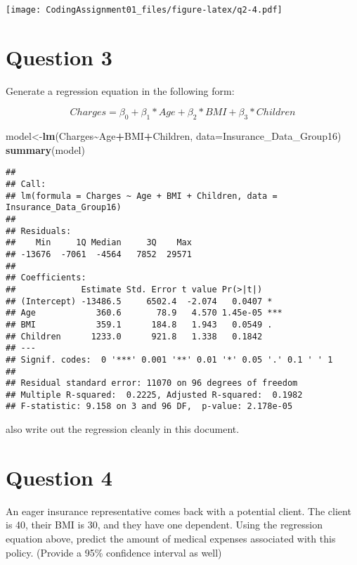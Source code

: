\documentclass[
]{article}
\newenvironment{Shaded}{\begin{snugshade}}{\end{snugshade}}
\newcommand{\AttributeTok}[1]{\textcolor[rgb]{0.13,0.29,0.53}{#1}}
\newcommand{\FunctionTok}[1]{\textcolor[rgb]{0.13,0.29,0.53}{\textbf{#1}}}
\newcommand{\NormalTok}[1]{#1}
\newcommand{\OtherTok}[1]{\textcolor[rgb]{0.56,0.35,0.01}{#1}}
\newcommand{\SpecialCharTok}[1]{\textcolor[rgb]{0.81,0.36,0.00}{\textbf{#1}}}
\begin{document}
\texttt{[image: CodingAssignment01\_files/figure-latex/q2-4.pdf]}

\hypertarget{question-3}{%
\section{Question 3}\label{question-3}}

Generate a regression equation in the following form:

\[Charges = \beta_{0}+\beta_{1}*Age+\beta_{2}*BMI+\beta_{3}*Children\]

\begin{Shaded}
\begin{Highlighting}[]
\NormalTok{model}\OtherTok{\textless{}{-}}\FunctionTok{lm}\NormalTok{(Charges}\SpecialCharTok{\textasciitilde{}}\NormalTok{Age}\SpecialCharTok{+}\NormalTok{BMI}\SpecialCharTok{+}\NormalTok{Children, }\AttributeTok{data=}\NormalTok{Insurance\_Data\_Group16)}
\FunctionTok{summary}\NormalTok{(model)}
\end{Highlighting}
\end{Shaded}

\begin{verbatim}
## 
## Call:
## lm(formula = Charges ~ Age + BMI + Children, data = Insurance_Data_Group16)
## 
## Residuals:
##    Min     1Q Median     3Q    Max 
## -13676  -7061  -4564   7852  29571 
## 
## Coefficients:
##             Estimate Std. Error t value Pr(>|t|)    
## (Intercept) -13486.5     6502.4  -2.074   0.0407 *  
## Age            360.6       78.9   4.570 1.45e-05 ***
## BMI            359.1      184.8   1.943   0.0549 .  
## Children      1233.0      921.8   1.338   0.1842    
## ---
## Signif. codes:  0 '***' 0.001 '**' 0.01 '*' 0.05 '.' 0.1 ' ' 1
## 
## Residual standard error: 11070 on 96 degrees of freedom
## Multiple R-squared:  0.2225, Adjusted R-squared:  0.1982 
## F-statistic: 9.158 on 3 and 96 DF,  p-value: 2.178e-05
\end{verbatim}

also write out the regression cleanly in this document.

\hypertarget{question-4}{%
\section{Question 4}\label{question-4}}

An eager insurance representative comes back with a potential client.
The client is 40, their BMI is 30, and they have one dependent. Using
the regression equation above, predict the amount of medical expenses
associated with this policy. (Provide a 95\% confidence interval as
well)
\end{document}
